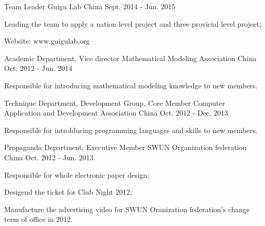 \begin{cventries}
  \cventry
    {Team Leader}
    {Guigu Lab}
    {China}
    {Sept. 2014 - Jun. 2015}
    {
      \begin{cvitems}
        \item {Leading the team to apply a nation level project and three provicial level project;}
        \item {Website: www.guigulab.org}
      \end{cvitems}
    }
  \cventry
    {Academic Department, Vice director}
    {Mathematical Modeling Association}
    {China}
    {Oct. 2012 - Jun. 2014}
    {
      \begin{cvitems}
        \item {Responsible for introducing mathematical modeling knowledge to new members.}
      \end{cvitems}
    }
  \cventry
    {Technique Department, Development Group, Core Member}
    {Computer Application and Development Association}
    {China}
    {Oct. 2012 - Dec. 2013}
    {
      \begin{cvitems}
        \item {Responsible for introlducing programming languages and skills to new members.}
      \end{cvitems}
    }
  \cventry
    {Propaganda Department, Executive Member}
    {SWUN Organization federation}
    {China}
    {Oct. 2012 - Jun. 2013}
    {
      \begin{cvitems}
        \item {Responsible for whole electronic paper design;}
        \item {Desigend the ticket for Club Night 2012;}
        \item {Manufacture the advertising video for SWUN Oranization federation’s change term of office in 2012.}
      \end{cvitems}
    }
\end{cventries}
